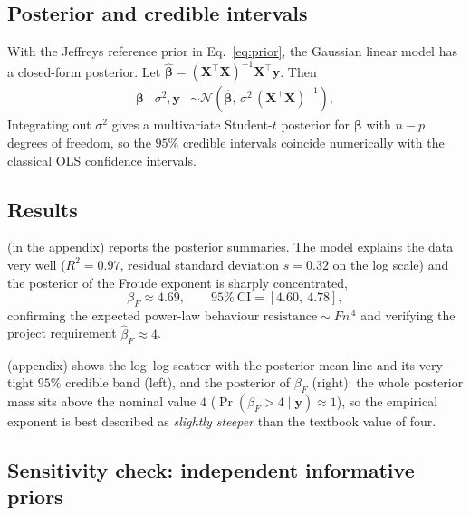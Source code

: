 \documentclass[12pt,a4paper]{article}
\begin{document}
\subsection{Posterior and credible intervals}

With the Jeffreys reference prior in Eq.~\eqref{eq:prior}, the Gaussian linear model has a closed-form posterior. Let $\hat{\bm{\beta}}=(\bm{X}^{\!\top}\bm{X})^{-1}\bm{X}^{\!\top}\bm{y}$. Then
\begin{align}
	\bm{\beta}\mid \sigma^2,\bm{y} & \sim
	\mathcal{N}\!\left(\hat{\bm{\beta}},\,
	             \sigma^2\,(\bm{X}^{\!\top}\bm{X})^{-1}\right), \label{eq:post_beta}
\end{align}
Integrating out $\sigma^2$ gives a multivariate Student-$t$ posterior for $\bm{\beta}$ with $n-p$ degrees of freedom, so the $95\%$ credible intervals coincide numerically with the classical OLS confidence intervals.

\subsection{Results}

 (in the appendix) reports the posterior summaries. The model explains the data very well ($R^2=0.97$, residual standard deviation $s=0.32$ on the log scale) and the posterior of the Froude exponent is sharply concentrated,
\begin{equation}
	\beta_F \approx 4.69, \qquad
	95\%\ \text{CI} = [4.60,\ 4.78],
\end{equation}
confirming the expected power-law behaviour $\mathrm{resistance}\sim Fn^{\,4}$ and verifying the project requirement $\hat\beta_F\approx 4$.

 (appendix) shows the log--log scatter with the posterior-mean line and its very tight $95\%$ credible band (left), and the posterior of $\beta_F$ (right): the whole posterior mass sits above the nominal value $4$ ($\Pr(\beta_F>4\mid\bm{y})\approx 1$), so the empirical exponent is best described as \emph{slightly steeper} than the textbook value of four.

\subsection{Sensitivity check: independent informative priors}
\label{sec:informative}
\end{document}

